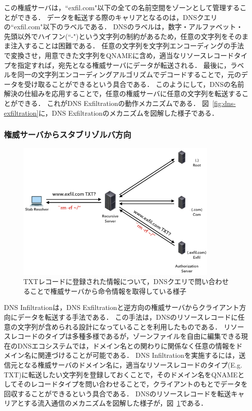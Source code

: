この権威サーバは，``exfil.com"以下の全ての名前空間をゾーンとして管理することができる．
データを転送する際のキャリアとなるのは，DNSクエリの``exfil.com"以下のラベルである．
DNSのラベルは，数字・アルファベット・先頭以外でハイフン(``-")という文字列の制約があるため，任意の文字列をそのまま注入することは困難である．
任意の文字列を文字列エンコーディングの手法で変換させ，用意できた文字列をQNAMEに含め，適当なリソースレコードタイプを指定すれば，宛先となる権威サーバにデータが転送される．
最後に，ラベルを同一の文字列エンコーディングアルゴリズムでデコードすることで，元のデータを受け取ることができるという具合である．
このようにして，DNSの名前解決の仕組みを応用することで，任意の権威サーバに任意の文字列を転送することができる．
これがDNS Exfiltrationの動作メカニズムである．
図~\ref{fig:dns-exfiltration}に，DNS Exfiltrationのメカニズムを図解した様子である．



\subsubsection{権威サーバからスタブリゾルバ方向}
\label{sec:dns-infiltration}

\begin{figure}[h]
 \centering
 \includegraphics[width=10.0cm]{figure/dns-infiltration.png}
 \caption{TXTレコードに登録された情報について，DNSクエリで問い合わせることで権威サーバから命令情報を取得している様子}
 \label{fig:dns-infiltration}
\end{figure}

DNS Infiltrationは，DNS Exfiltrationと逆方向の権威サーバからクライアント方向にデータを転送する手法である．
この手法は，DNSのリソースレコードに任意の文字列が含められる設計になっていることを利用したものである．
リソースレコードのタイプは多種多様であるが，ゾーンファイルを自由に編集できる現在のDNSエコシステムでは，ドメイン名との関わりに関係なく任意の情報をドメイン名に関連づけることが可能である．
DNS Infiltrationを実施するには，送信元となる権威サーバのドメイン名に，適当なリソースレコードのタイプ(E.g. TXT)に転送したい文字列を登録しておくことで，そのドメイン名をQNAMEとしてそのレコードタイプを問い合わせることで，クライアントのもとでデータを回収することができるという具合である．
DNSのリソースレコードを転送キャリアとする流入通信のメカニズムを図解した様子が，図~\ref{fig:dns-infiltration}である．


